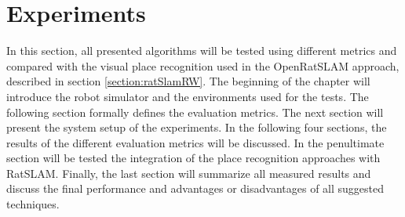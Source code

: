 \chapter{Experiments}\label{chapter:experiments}

In this section, all presented algorithms will be tested using different metrics and compared with the visual place recognition used in the OpenRatSLAM approach, described in section \ref{section:ratSlamRW}. The beginning of the chapter will introduce the robot simulator and the environments used for the tests. The following section formally defines the evaluation metrics. The next section will present the system setup of the experiments. In the following four sections, the results of the different evaluation metrics will be discussed. In the penultimate section will be tested the integration of the place recognition approaches with RatSLAM. Finally, the last section will summarize all measured results and discuss the final performance and advantages or disadvantages of all suggested techniques.











